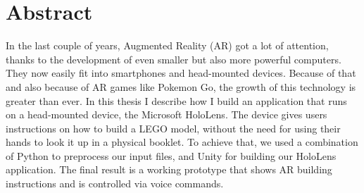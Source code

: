 

\chapter*{Abstract}
\label{cha:abstract}


In the last couple of years, Augmented Reality (AR) got a lot of attention, thanks to the development of even smaller but also more powerful computers. They now easily fit into smartphones and head-mounted devices. Because of that and also because of AR games like Pokemon Go, the growth of this technology is greater than ever. In this thesis I describe how I build an application that runs on a head-mounted device, the Microsoft HoloLens. The device gives users instructions on how to build a LEGO model, without the need for using their hands to look it up in a physical booklet. To achieve that, we used a combination of Python to preprocess our input files, and Unity for building our HoloLens application. The final result is a working prototype that shows AR building
instructions and is controlled via voice commands.  



